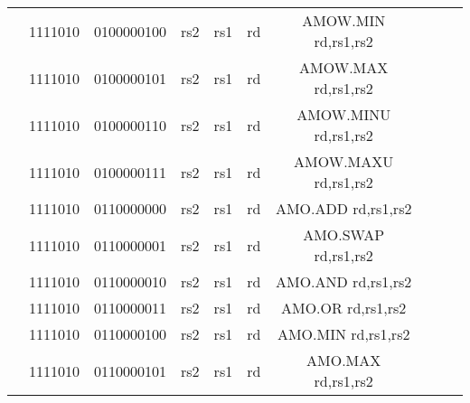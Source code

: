 \begin{table}[p]
\begin{small}
\begin{center}
\begin{tabular}{rcccccccccccl}
&
\multicolumn{1}{|c|}{1111010} &
\multicolumn{4}{c|}{0100000100} &
\multicolumn{1}{c|}{rs2} &
\multicolumn{1}{c|}{rs1} &
\multicolumn{1}{c|}{rd} & AMOW.MIN rd,rs1,rs2 \\
\cline{2-9}
  

&
\multicolumn{1}{|c|}{1111010} &
\multicolumn{4}{c|}{0100000101} &
\multicolumn{1}{c|}{rs2} &
\multicolumn{1}{c|}{rs1} &
\multicolumn{1}{c|}{rd} & AMOW.MAX rd,rs1,rs2 \\
\cline{2-9}
  

&
\multicolumn{1}{|c|}{1111010} &
\multicolumn{4}{c|}{0100000110} &
\multicolumn{1}{c|}{rs2} &
\multicolumn{1}{c|}{rs1} &
\multicolumn{1}{c|}{rd} & AMOW.MINU rd,rs1,rs2 \\
\cline{2-9}
  

&
\multicolumn{1}{|c|}{1111010} &
\multicolumn{4}{c|}{0100000111} &
\multicolumn{1}{c|}{rs2} &
\multicolumn{1}{c|}{rs1} &
\multicolumn{1}{c|}{rd} & AMOW.MAXU rd,rs1,rs2 \\
\cline{2-9}
  

&
\multicolumn{1}{|c|}{1111010} &
\multicolumn{4}{c|}{0110000000} &
\multicolumn{1}{c|}{rs2} &
\multicolumn{1}{c|}{rs1} &
\multicolumn{1}{c|}{rd} & AMO.ADD rd,rs1,rs2 \\
\cline{2-9}
  

&
\multicolumn{1}{|c|}{1111010} &
\multicolumn{4}{c|}{0110000001} &
\multicolumn{1}{c|}{rs2} &
\multicolumn{1}{c|}{rs1} &
\multicolumn{1}{c|}{rd} & AMO.SWAP rd,rs1,rs2 \\
\cline{2-9}
  

&
\multicolumn{1}{|c|}{1111010} &
\multicolumn{4}{c|}{0110000010} &
\multicolumn{1}{c|}{rs2} &
\multicolumn{1}{c|}{rs1} &
\multicolumn{1}{c|}{rd} & AMO.AND rd,rs1,rs2 \\
\cline{2-9}
  

&
\multicolumn{1}{|c|}{1111010} &
\multicolumn{4}{c|}{0110000011} &
\multicolumn{1}{c|}{rs2} &
\multicolumn{1}{c|}{rs1} &
\multicolumn{1}{c|}{rd} & AMO.OR rd,rs1,rs2 \\
\cline{2-9}
  

&
\multicolumn{1}{|c|}{1111010} &
\multicolumn{4}{c|}{0110000100} &
\multicolumn{1}{c|}{rs2} &
\multicolumn{1}{c|}{rs1} &
\multicolumn{1}{c|}{rd} & AMO.MIN rd,rs1,rs2 \\
\cline{2-9}
  

&
\multicolumn{1}{|c|}{1111010} &
\multicolumn{4}{c|}{0110000101} &
\multicolumn{1}{c|}{rs2} &
\multicolumn{1}{c|}{rs1} &
\multicolumn{1}{c|}{rd} & AMO.MAX rd,rs1,rs2 \\
\cline{2-9}
  


\end{tabular}
\end{center}
\end{small}
\end{table}
